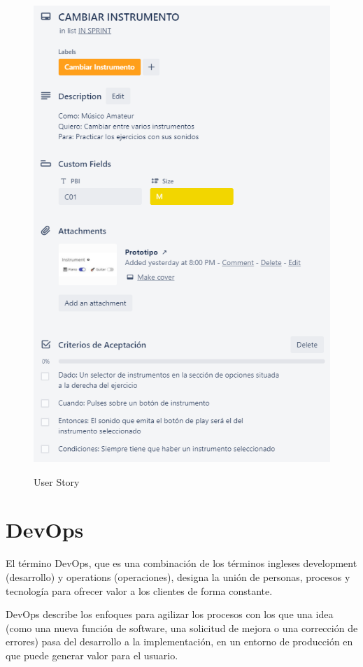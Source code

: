 \documentclass[12pt,twoside,titlepage]{report}
\begin{document}
\begin{figure}[H]
    \centering
    \includegraphics[scale=0.7]{Scrum/UserStory}
    \label{fig:UserStory}
    \caption{User Story}
\end{figure}

\section{DevOps}

El término DevOps, que es una combinación de los términos ingleses development (desarrollo) y operations (operaciones), designa la unión de personas, procesos y tecnología para ofrecer valor a los clientes de forma constante.

DevOps describe los enfoques para agilizar los procesos con los que una idea (como una nueva función de software, una solicitud de mejora o una corrección de errores) pasa del desarrollo a la implementación, en un entorno de producción en que puede generar valor para el usuario.
\end{document}
